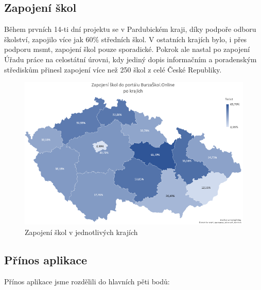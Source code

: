\subsection{Zapojení škol}

Během prvních 14-ti dní projektu se v Pardubickém kraji, díky podpoře odboru školství, zapojilo více jak 60\% středních škol.
V ostatních krajích bylo, i přes podporu \acrshort{msmt}, zapojení škol pouze sporadické.
Pokrok ale nastal po zapojení Úřadu práce na celostátní úrovni,
kdy jediný dopis informačním a poradenským střediskům přinesl zapojení více než 250 škol z celé České Republiky.

\begin{figure}[H]
\centering
\includegraphics[width=\textwidth]{img/kraje-zapojeni.png}
\caption{Zapojení škol v jednotlivých krajích}\label{fig:kraje-zapojeni}
\end{figure}

\subsection{Přínos aplikace}

Přínos aplikace jsme rozdělili do hlavních pěti bodů:

